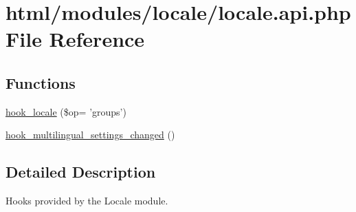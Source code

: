 \hypertarget{locale_8api_8php}{
\section{html/modules/locale/locale.api.php File Reference}
\label{locale_8api_8php}
}
\subsection*{Functions}
\begin{DoxyCompactItemize}
\item 
\hyperlink{group__hooks_ga7d8968676deb891e4838c2d3173de7f6}{hook\_\-locale} (\$op= 'groups')
\item 
\hyperlink{group__hooks_ga87a996b741bb1787b2451a2b842e20e8}{hook\_\-multilingual\_\-settings\_\-changed} ()
\end{DoxyCompactItemize}


\subsection{Detailed Description}
Hooks provided by the Locale module. 